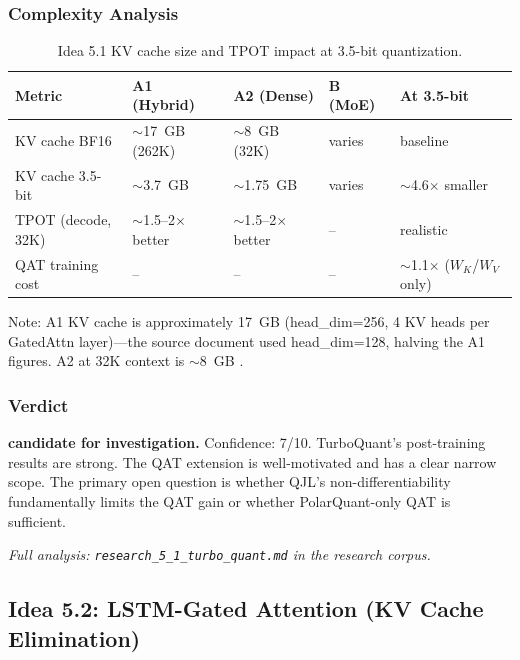 \documentclass[11pt]{article}
\begin{document}
\subsubsection*{Complexity Analysis}

\begin{table}[h]
\centering
\caption{Idea 5.1 KV cache size and TPOT impact at 3.5-bit quantization.}
\small
\begin{tabular}{lllll}
\toprule
Metric & A1 (Hybrid) & A2 (Dense) & B (MoE) & At 3.5-bit \\
\midrule
KV cache BF16 & $\sim$17~GB (262K) & $\sim$8~GB (32K) & varies & baseline \\
KV cache 3.5-bit & $\sim$3.7~GB & $\sim$1.75~GB & varies & $\sim$4.6$\times$ smaller \\
TPOT (decode, 32K) & $\sim$1.5--2$\times$ better & $\sim$1.5--2$\times$ better & -- & realistic \\
QAT training cost & -- & -- & -- & $\sim$1.1$\times$ ($W_K$/$W_V$ only) \\
\bottomrule
\end{tabular}
\end{table}

Note: A1 KV cache is approximately 17~GB (head\_dim=256, 4 KV heads per GatedAttn layer)---the source document used head\_dim=128, halving the A1 figures. A2 at 32K context is $\sim$8~GB .

\subsubsection*{Verdict}

\noindent\textbf{candidate for investigation.} Confidence: 7/10. TurboQuant's post-training results are strong. The QAT extension is well-motivated and has a clear narrow scope. The primary open question is whether QJL's non-differentiability fundamentally limits the QAT gain or whether PolarQuant-only QAT is sufficient.

\par\noindent\textit{Full analysis: \texttt{research\_5\_1\_turbo\_quant.md} in the research corpus.}


\subsection{Idea 5.2: LSTM-Gated Attention (KV Cache Elimination)}
\label{subsec:idea52}
\end{document}
